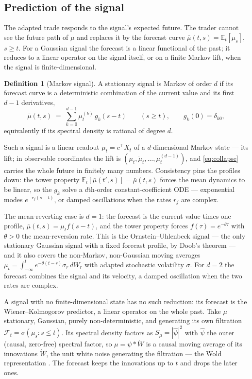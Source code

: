 \documentclass[11pt]{article}
\newcommand{\E}{\mathbb{E}}
\newcommand{\F}{\mathcal{F}}
\theoremstyle{plain}
\theoremstyle{definition}
\newtheorem{definition}{Definition}
\theoremstyle{remark}
\begin{document}
\subsection{Prediction of the signal}\label{sec:meanrev}

The adapted trade responds to the signal's expected future. The trader cannot see the future path of $\mu$ and replaces it by the forecast curve $\bar\mu(t,s)=\E_t[\mu_s]$, $s\ge t$. For a Gaussian signal the forecast is a linear functional of the past; it reduces to a linear operator on the signal itself, or on a finite Markov lift, when the signal is finite-dimensional.

\begin{definition}[Markov signal]\label{def:mr}
A stationary signal is Markov of order $d$ if its forecast curve is a deterministic combination of the current value and its first $d-1$ derivatives,
\begin{equation}\label{eq:collapse}
\bar\mu(t,s) \;=\; \sum_{k=0}^{d-1}\mu^{(k)}_t\,g_k(s-t)\qquad (s\ge t),\qquad g_k(0)=\delta_{k0},
\end{equation}
equivalently if its spectral density is rational of degree $d$.
\end{definition}

Such a signal is a linear readout $\mu_t=c^{\!\top}X_t$ of a $d$-dimensional Markov state --- its lift; in observable coordinates the lift is $(\mu_t,\dot\mu_t,\dots,\mu^{(d-1)}_t)$, and \eqref{eq:collapse} carries the whole future in finitely many numbers. Consistency pins the profiles down: the tower property $\E_t[\bar\mu(t',s)]=\bar\mu(t,s)$ forces the mean dynamics to be linear, so the $g_k$ solve a $d$th-order constant-coefficient ODE --- exponential modes $e^{-r_j(s-t)}$, or damped oscillations when the rates $r_j$ are complex.

The mean-reverting case is $d=1$: the forecast is the current value times one profile, $\bar\mu(t,s)=\mu_t f(s-t)$, and the tower property forces $f(\tau)=e^{-\theta\tau}$ with $\theta>0$ the mean-reversion rate. This is the Ornstein--Uhlenbeck signal --- the only stationary Gaussian signal with a fixed forecast profile, by Doob's theorem --- and it also covers the non-Markov, non-Gaussian moving averages $\mu_t=\int_{-\infty}^t e^{-\theta(t-r)}\sigma_r\,dW_r$ with adapted stochastic volatility $\sigma$. For $d=2$ the forecast combines the signal and its velocity, a damped oscillation when the two rates are complex.

A signal with no finite-dimensional state has no such reduction: its forecast is the Wiener--Kolmogorov predictor, a linear operator on the whole past. Take $\mu$ stationary, Gaussian, purely non-deterministic, and generating its own filtration $\F_t=\sigma(\mu_s:s\le t)$. Its spectral density factors as $S_\mu=|\hat\psi|^2$ with $\hat\psi$ the outer (causal, zero-free) spectral factor, so $\mu=\psi\ast\dot W$ is a causal moving average of its innovations $\dot W$, the unit white noise generating the filtration --- the Wold representation \citep{Wiener1949,Whittle1963}. The forecast keeps the innovations up to $t$ and drops the later ones.
\end{document}
